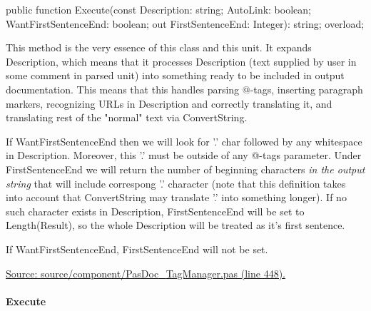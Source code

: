 \documentclass{report}
\newif\ifpdf
\begin{document}
\label{PasDoc_TagManager.TTagManager-Execute}
\begin{list}{}{
\setlength{\itemindent}{0cm}
\setlength{\listparindent}{0cm}
\setlength{\leftmargin}{\evensidemargin}
\addtolength{\leftmargin}{\tmplength}
\settowidth{\labelsep}{X}
\addtolength{\leftmargin}{\labelsep}
\setlength{\labelwidth}{\tmplength}
}
\item[\textbf{Declaration}\hfill]
\ifpdf
\begin{flushleft}
\fi
\begin{ttfamily}
public function Execute(const Description: string; AutoLink: boolean; WantFirstSentenceEnd: boolean; out FirstSentenceEnd: Integer): string; overload;\end{ttfamily}

\ifpdf
\end{flushleft}
\fi

\par
\item[\textbf{Description}]
This method is the very essence of this class and this unit. It expands Description, which means that it processes Description (text supplied by user in some comment in parsed unit) into something ready to be included in output documentation. This means that this handles parsing @{-}tags, inserting paragraph markers, recognizing URLs in Description and correctly translating it, and translating rest of the "normal" text via ConvertString.

If WantFirstSentenceEnd then we will look for '.' char followed by any whitespace in Description. Moreover, this '.' must be outside of any @{-}tags parameter. Under FirstSentenceEnd we will return the number of beginning characters \textit{in the output string} that will include correspong '.' character (note that this definition takes into account that ConvertString may translate '.' into something longer). If no such character exists in Description, FirstSentenceEnd will be set to Length(Result), so the whole Description will be treated as it's first sentence.

If WantFirstSentenceEnd, FirstSentenceEnd will not be set.\par
\href{https://github.com/pasdoc/pasdoc/blob/master/source/component/PasDoc_TagManager.pas#L448}{Source: source/component/PasDoc{\_}TagManager.pas (line 448).}

\end{list}
\paragraph*{Execute}\hspace*{\fill}
\end{document}
